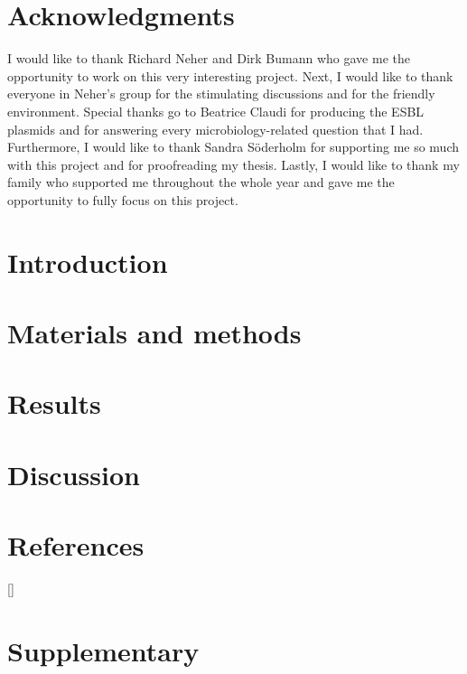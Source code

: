 \documentclass[12pt,twoside]{report}
\begin{document}
\chapter*{Acknowledgments}
I would like to thank Richard Neher and Dirk Bumann who gave me the opportunity to work on this very interesting project. Next, I would like to thank everyone in Neher's group for the stimulating discussions and for the friendly environment. Special thanks go to Beatrice Claudi for producing the ESBL plasmids and for answering every microbiology-related question that I had. Furthermore, I would like to thank Sandra Söderholm for supporting me so much with this project and for proofreading my thesis. 
Lastly, I would like to thank my family who supported me throughout the whole year and gave me the opportunity to fully focus on this project. 
\tableofcontents
{}
\chapter{Introduction}



\chapter{Materials and methods}


\chapter{Results}


\chapter{Discussion}


\chapter{References}
\let\Origclearpage\clearpage
\let\clearpage\relax
{}[\refname]{}
\printbibliography
\newpage
\chapter{Supplementary}


\end{document}
